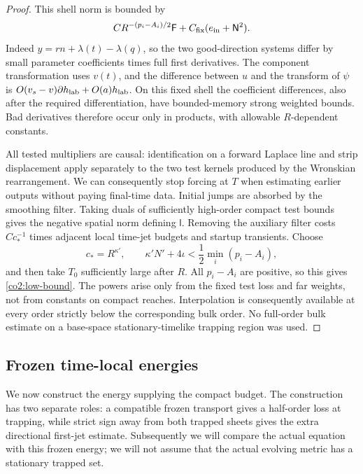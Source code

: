 \begin{proof}
This shell norm is bounded by
\begin{equation}\label{co2:low-shell}
 C R^{-(p_i-A_i)/2}\mathsf F
        +C_{\rm fix}(e_{\rm in}+\mathsf N^2).
\end{equation}
Indeed $y=rn+\lambda(t)-\lambda(q)$, so the two good-direction systems
differ by small parameter coefficients times full first derivatives.  The
component transformation uses $v(t)$, and the difference between $u$ and
the transform of $\psi$ is
$O(v_s-v)\partial h_{\rm lab}+O(a)h_{\rm lab}$.  On this fixed shell the
coefficient differences, also after the required differentiation, have
bounded-memory strong weighted bounds.  Bad derivatives therefore occur only
in products, with allowable $R$-dependent constants.

All tested multipliers are causal: identification on a forward Laplace line
and strip displacement apply separately to the two test kernels produced by
the Wronskian rearrangement.  We can consequently stop forcing at $T$ when
estimating earlier outputs without paying final-time data.  Initial jumps are
absorbed by the smoothing filter.  Taking duals of sufficiently high-order
compact test bounds gives the negative spatial norm defining $\mathsf l$.
Removing the auxiliary filter costs $C c_*^{-1}$ times adjacent local
time-jet budgets and startup transients.  Choose
\[
 c_*=R^{\kappa'},\qquad
 \kappa'N'+4\iota<\frac12\min_i(p_i-A_i),
\]
and then take $T_0$ sufficiently large after $R$.  All $p_i-A_i$ are
positive, so this gives \eqref{co2:low-bound}.  The powers arise only from
the fixed test loss and far weights, not from constants on compact reaches.
Interpolation is consequently available at every order strictly below the
corresponding bulk order.  No full-order bulk estimate on a base-space
stationary-timelike trapping region was used.
\end{proof}

\subsection{Frozen time-local energies}

We now construct the energy supplying the compact budget.  The construction
has two separate roles: a compatible frozen transport gives a half-order loss
at trapping, while strict sign away from both trapped sheets gives the extra
directional first-jet estimate.  Subsequently we will compare the actual
equation with this frozen energy; we will not assume that the actual evolving
metric has a stationary trapped set.

